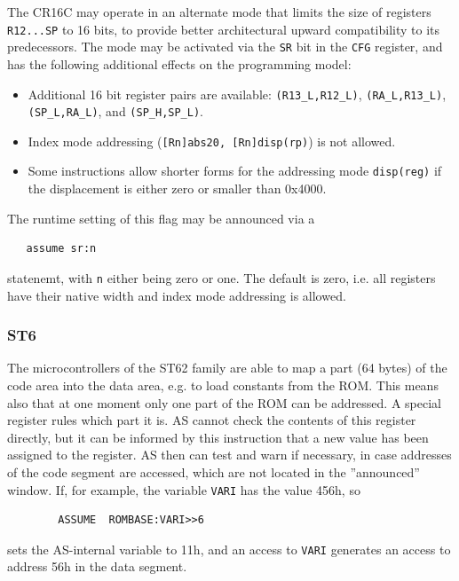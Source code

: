 \documentclass[12pt,twoside]{report}
\newcommand{\tty}[1]{{\tt #1}}
\newcommand{\asname}{{AS}}
\begin{document}
The CR16C may operate in an alternate mode that limits the size of registers
\tty{R12...SP} to 16 bits, to provide better architectural upward compatibility to
its predecessors.  The mode may be activated via the \tty{SR} bit in the
\tty{CFG} register, and has the following additional effects on the programming
model:
\begin{itemize}
\item{Additional 16 bit register pairs are available: \tty{(R13\_L,R12\_L)},
      \tty{(RA\_L,R13\_L)}, \tty{(SP\_L,RA\_L)}, and \tty{(SP\_H,SP\_L)}.}
\item{Index mode addressing (\tty{[Rn]abs20, [Rn]disp(rp)}) is not allowed.}
\item{Some instructions allow shorter forms for the addressing mode \tty{disp(reg)}
      if the displacement is either zero or smaller than 0x4000.}
\end{itemize}
The runtime setting of this flag may be announced via a
\begin{verbatim}
   assume sr:n
\end{verbatim}
statenemt, with \tty{n} either being zero or one.  The default is zero, i.e. all
registers have their native width and index mode addressing is allowed.


\subsubsection{ST6}
\label{ST6Assume}

The microcontrollers of the ST62 family are able to map a part (64 bytes)
of the code area into the data area, e.g. to load constants from the ROM.
This means also that at one moment only one part of the ROM can be
addressed.  A special register rules which part it is.  \asname{} cannot check
the contents of this register directly, but it can be informed by this
instruction that a new value has been assigned to the register.  \asname{} then
can test and warn if necessary, in case addresses of the code segment are
accessed, which are not located in the ''announced'' window.  If, for
example, the variable \tty{VARI} has the value 456h, so
\begin{verbatim}
        ASSUME  ROMBASE:VARI>>6
\end{verbatim}
sets the \asname{}-internal variable to 11h, and an access to \tty{VARI}
generates an access to address 56h in the data segment.
\end{document}

